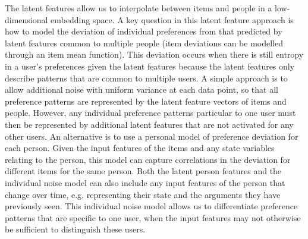 The latent features allow us to interpolate between items and people in a low-dimensional embedding space. 
A key question in this latent feature approach is how to model the deviation of individual 
preferences from that predicted by latent features common to multiple people (item deviations
can be modelled through an item mean function).
This deviation occurs when there is still entropy in a user's preferences given the latent features
because the latent features only describe patterns that are common to multiple users.
A simple approach is to allow additional noise with uniform variance at each data point, 
so that all preference patterns are represented by the latent feature vectors of items and people.
However, any individual preference patterns particular to one user must then be represented by additional
latent features that are not activated for any other users. 
An alternative is to use a personal model of preference deviation for each person. 
Given the input features of the items and any state variables relating to the person, 
this model can capture correlations in the deviation for different items for the same person. 
Both the latent person features and the individual noise model can also include any input features of 
the person that change over time, e.g. representing their state and the arguments they have 
previously seen. 
This individual noise model allows us to differentiate preference patterns that are specific to 
one user, when the input features may not otherwise be sufficient to distinguish these users. 

